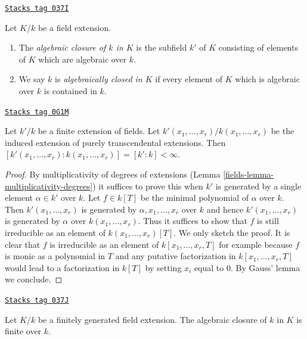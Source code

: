 \begin{definition}
\label{fields-definition-algebraically-closed-in}
\href{https://stacks.math.columbia.edu/tag/037I}{\texttt{Stacks tag 037I}}

Let $K/k$ be a field extension.
\begin{enumerate}
\item The {\it algebraic closure of $k$ in $K$} is the subfield
$k'$ of $K$ consisting of elements of $K$ which are algebraic over $k$.
\item We say $k$ is {\it algebraically closed in $K$} if
every element of $K$ which is algebraic over $k$ is
contained in $k$.
\end{enumerate}
\end{definition}

\begin{lemma}
\label{fields-lemma-purely-transcendental-degree}
\href{https://stacks.math.columbia.edu/tag/0G1M}{\texttt{Stacks tag 0G1M}}

Let $k'/k$ be a finite extension of fields. Let
$k'(x_1, \ldots, x_r)/k(x_1, \ldots, x_r)$ be the
induced extension of purely transcendental extensions.
Then $[k'(x_1, \ldots, x_r) : k(x_1, \ldots, x_r)] = [k' : k] < \infty$.
\end{lemma}

\begin{proof}

By multiplicativity of degrees of extensions
(Lemma \ref{fields-lemma-multiplicativity-degrees})
it suffices to prove this when $k'$ is generated by a single element
$\alpha \in k'$ over $k$. Let $f \in k[T]$ be the minimal polynomial
of $\alpha$ over $k$. Then $k'(x_1, \ldots, x_r)$ is generated
by $\alpha, x_1, \ldots, x_r$ over $k$ and hence $k'(x_1, \ldots, x_r)$
is generated by $\alpha$ over $k(x_1, \ldots, x_r)$.
Thus it suffices to show that $f$ is still irreducible as
an element of $k(x_1, \ldots, x_r)[T]$. We only sketch the proof.
It is clear that $f$ is irreducible as an element of
$k[x_1, \ldots, x_r, T]$ for example because $f$ is monic
as a polynomial in $T$ and any putative factorization in
$k[x_1, \ldots, x_r, T]$ would lead to a factorization in $k[T]$
by setting $x_i$ equal to $0$. By Gauss' lemma we conclude.
\end{proof}

\begin{lemma}
\label{fields-lemma-algebraic-closure-in-finitely-generated}
\href{https://stacks.math.columbia.edu/tag/037J}{\texttt{Stacks tag 037J}}

Let $K/k$ be a finitely generated field extension.
The algebraic closure of $k$ in $K$ is finite over $k$.
\end{lemma}

